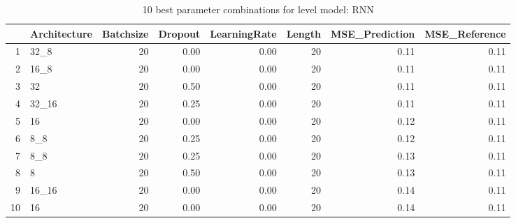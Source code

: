 \begin{table}[ht]
\centering
\begin{tabular}{rlrrrrrr}
  \hline
 & Architecture & Batchsize & Dropout & LearningRate & Length & MSE\_Prediction & MSE\_Reference \\ 
  \hline
1 & 32\_8 &  20 & 0.00 & 0.00 &  20 & 0.11 & 0.11 \\ 
  2 & 16\_8 &  20 & 0.00 & 0.00 &  20 & 0.11 & 0.11 \\ 
  3 & 32 &  20 & 0.50 & 0.00 &  20 & 0.11 & 0.11 \\ 
  4 & 32\_16 &  20 & 0.25 & 0.00 &  20 & 0.11 & 0.11 \\ 
  5 & 16 &  20 & 0.00 & 0.00 &  20 & 0.12 & 0.11 \\ 
  6 & 8\_8 &  20 & 0.25 & 0.00 &  20 & 0.12 & 0.11 \\ 
  7 & 8\_8 &  20 & 0.25 & 0.00 &  20 & 0.13 & 0.11 \\ 
  8 & 8 &  20 & 0.50 & 0.00 &  20 & 0.13 & 0.11 \\ 
  9 & 16\_16 &  20 & 0.00 & 0.00 &  20 & 0.14 & 0.11 \\ 
  10 & 16 &  20 & 0.00 & 0.00 &  20 & 0.14 & 0.11 \\ 
   \hline
\end{tabular}
\caption{10 best parameter combinations for level model: RNN} 
\label{tab:RNN_top_10}
\end{table}

